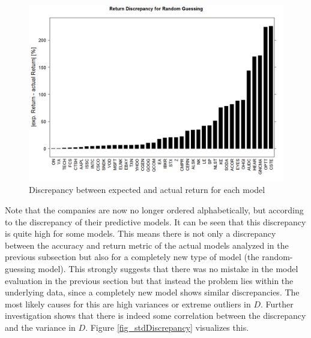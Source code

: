 \begin{figure}[h]
	\centering
  	\includegraphics[width=\textwidth]{returnDiscrepancy}
	\caption[Model Discrepancy]{Discrepancy between expected and actual return for each model}
	\label{fig_returnDiscrepancy}
\end{figure}

Note that the companies are now no longer ordered alphabetically, but according to the discrepancy of their predictive models. It can be seen that this discrepancy is quite high for some models. This means there is not only a discrepancy between the accuracy and return metric of the actual models analyzed in the previous subsection but also for a completely new type of model (the random-guessing model). This strongly suggests that there was no mistake in the model evaluation in the previous section but that instead the problem lies within the underlying data, since a completely new model shows similar discrepancies. The most likely causes for this are high variances or extreme outliers in $D$. Further investigation shows that there is indeed some correlation between the discrepancy and the variance in $D$. Figure \ref{fig_stdDiscrepancy} visualizes this.

